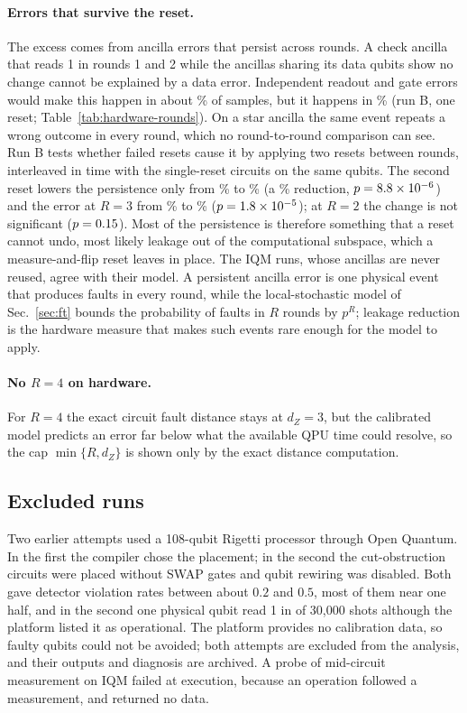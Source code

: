 \documentclass[aps,prx,reprint,superscriptaddress,nofootinbib,floatfix,longbibliography]{revtex4-2}
\theoremstyle{definition}
\begin{document}
\paragraph{Errors that survive the reset.}
The excess comes from ancilla errors that persist across rounds.  A check
ancilla that reads 1 in rounds 1 and 2 while the ancillas sharing its data
qubits show no change cannot be explained by a data error.  Independent
readout and gate errors would make this happen in about \hwPersIndep\% of
samples, but it happens in \hwPersSingle\% (run B, one reset;
Table~\ref{tab:hardware-rounds}).  On a star ancilla the same event repeats a
wrong outcome in every round, which no round-to-round comparison can see.
Run B tests whether failed resets cause it by applying two resets between
rounds, interleaved in time with the single-reset circuits on the same
qubits.  The second reset lowers the persistence only from \hwPersSingle\% to
\hwPersDouble\% (a \hwPersRel\% reduction, $p=8.8\times10^{-6}$) and the error at
$R=3$ from \hwResetThreeS\% to \hwResetThreeD\% ($p=1.8\times10^{-5}$); at $R=2$
the change is not significant ($p=0.15$).  Most of the persistence is
therefore something that a reset cannot undo, most likely leakage out of the
computational subspace, which a measure-and-flip reset leaves in place.  The
IQM runs, whose ancillas are never reused, agree with their model.  A
persistent ancilla error is one physical event that produces faults in every
round, while the local-stochastic model of Sec.~\ref{sec:ft} bounds the
probability of faults in $R$ rounds by $p^R$; leakage reduction is the
hardware measure that makes such events rare enough for the model to apply.

\paragraph{No $R=4$ on hardware.}
For $R=4$ the exact circuit fault distance stays at $d_Z=3$, but the
calibrated model predicts an error far below what the available QPU time
could resolve, so the cap $\min\{R,d_Z\}$ is shown only by the exact
distance computation.

\subsection{Excluded runs}
Two earlier attempts used a 108-qubit Rigetti processor through Open Quantum.
In the first the compiler chose the placement; in the second the
cut-obstruction circuits were placed without SWAP gates and qubit rewiring was
disabled.  Both gave detector violation rates between about $0.2$ and $0.5$,
most of them near one half, and in the second one physical qubit read 1 in \hwStuck{} of 30{,}000 shots although
the platform listed it as operational.  The platform provides no calibration
data, so faulty qubits could not be avoided; both attempts are excluded from
the analysis, and their outputs and diagnosis are archived.  A probe of
mid-circuit measurement on IQM failed at execution, because an operation
followed a measurement, and returned no data.
\end{document}
